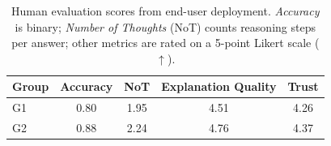 \documentclass[11pt]{article}
\begin{document}






\begin{table}[t]
\centering
\caption{
Human evaluation scores from end-user deployment. \textit{Accuracy} is binary; \textit{Number of Thoughts} (NoT) counts reasoning steps per answer; other metrics are rated on a 5-point Likert scale ($\uparrow$).
}
\label{tab:result_2}
\begin{tabular}{l|cccc}
\toprule
\textbf{Group} & \textbf{Accuracy} & \textbf{NoT} & \textbf{Explanation Quality} & \textbf{Trust} \\
\midrule
G1  & 0.80 & 1.95 & 4.51 & 4.26 \\
G2  & 0.88 & 2.24 & 4.76 & 4.37 \\
\bottomrule
\end{tabular}
\end{table}
\end{document}
